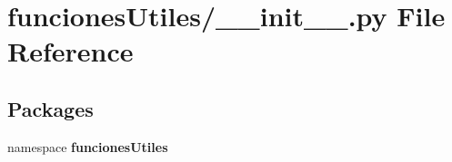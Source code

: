 \section{funciones\-Utiles/\-\_\-\-\_\-init\-\_\-\-\_\-.py \-File \-Reference}
\label{funciones_utiles_2____init_____8py}
\subsection*{\-Packages}
\begin{DoxyCompactItemize}
\item 
namespace {\bf funciones\-Utiles}
\end{DoxyCompactItemize}
